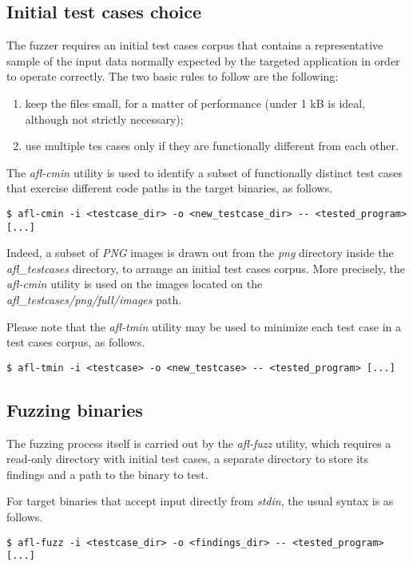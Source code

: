 \subsection{Initial test cases choice}
The fuzzer requires an initial test cases corpus that contains a representative sample of the input data normally expected by the targeted application in order to operate correctly.
The two basic rules to follow are the following\parencite{AFL_readme}:
\begin{enumerate}[itemsep=1pt]
    \item keep the files small, for a matter of performance (under 1 kB is ideal, although not strictly necessary);
    \item use multiple tes cases only if they are functionally different from each other.
\end{enumerate}

The \textit{afl-cmin} utility is used to identify a subset of functionally distinct test cases that exercise different code paths in the target binaries, as follows.
\begin{lstlisting}
$ afl-cmin -i <testcase_dir> -o <new_testcase_dir> -- <tested_program> [...]
\end{lstlisting}

Indeed, a subset of \textit{PNG} images is drawn out from the \textit{png} directory inside the \textit{afl\_testcases} directory\parencite{AFL_testcases}, to arrange an initial test cases corpus.
More precisely, the \textit{afl-cmin} utility is used on the images located on the \textit{afl\_testcases/png/full/images} path.

Please note that the \textit{afl-tmin} utility may be used to minimize each test case in a test cases corpus, as follows.
\begin{lstlisting}
$ afl-tmin -i <testcase> -o <new_testcase> -- <tested_program> [...]
\end{lstlisting}

\subsection{Fuzzing binaries}
The fuzzing process itself is carried out by the \textit{afl-fuzz} utility, which requires a read-only directory with initial test cases, a separate directory to store its findings and a path to the binary to test.

For target binaries that accept input directly from \textit{stdin}, the usual syntax is as follows\parencite{AFL_guide}\parencite{AFL_readme}.
\begin{lstlisting}
$ afl-fuzz -i <testcase_dir> -o <findings_dir> -- <tested_program> [...]
\end{lstlisting}

